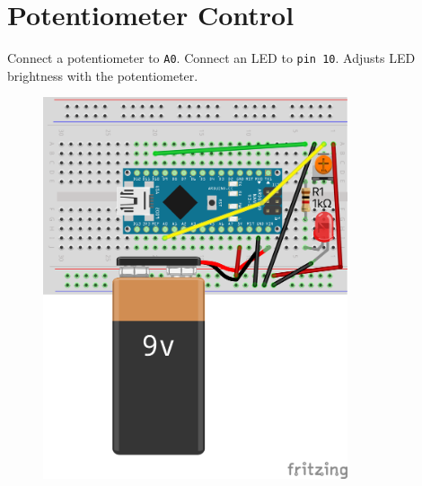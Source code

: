 \documentclass{article}
\begin{document}
\section*{Potentiometer Control}
\begin{minipage}{\textwidth}
Connect a potentiometer to \texttt{A0}. Connect an LED to \texttt{pin 10}. Adjusts LED brightness with the potentiometer.
\end{minipage}
\begin{figure}[h!]
\centering
\includegraphics[width=0.8\textwidth]{potent_nano_bb.png}
\end{figure}
\end{document}
